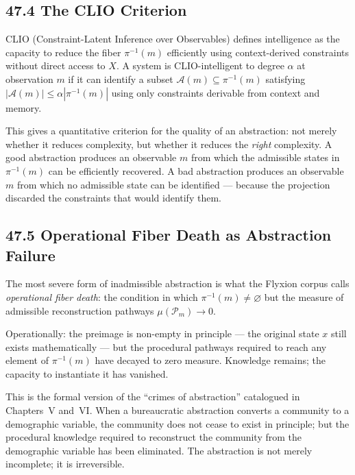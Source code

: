 \documentclass[12pt,letterpaper]{article}
\theoremstyle{remark}
\begin{document}
\subsection{47.4 The CLIO Criterion}

CLIO (Constraint-Latent Inference over Observables) defines
intelligence as the capacity to reduce the fiber $\pi^{-1}(m)$
efficiently using context-derived constraints without direct access
to $X$. A system is CLIO-intelligent to degree $\alpha$ at
observation $m$ if it can identify a subset
$\mathcal{A}(m) \subseteq \pi^{-1}(m)$ satisfying
$|\mathcal{A}(m)| \leq \alpha |\pi^{-1}(m)|$ using only
constraints derivable from context and memory.

This gives a quantitative criterion for the quality of an
abstraction: not merely whether it reduces complexity, but whether
it reduces the \emph{right} complexity. A good abstraction
produces an observable $m$ from which the admissible states in
$\pi^{-1}(m)$ can be efficiently recovered. A bad abstraction
produces an observable $m$ from which no admissible state can
be identified — because the projection discarded the constraints
that would identify them.

\subsection{47.5 Operational Fiber Death as Abstraction Failure}

The most severe form of inadmissible abstraction is what the
Flyxion corpus calls \emph{operational fiber death}: the condition
in which $\pi^{-1}(m) \neq \varnothing$ but the measure of
admissible reconstruction pathways $\mu(\mathcal{P}_m) \to 0$.

Operationally: the preimage is non-empty in principle — the
original state $x$ still exists mathematically — but the procedural
pathways required to reach any element of $\pi^{-1}(m)$ have
decayed to zero measure. Knowledge remains; the capacity to
instantiate it has vanished.

This is the formal version of the ``crimes of abstraction''
catalogued in Chapters~V and~VI. When a bureaucratic abstraction
converts a community to a demographic variable, the community does
not cease to exist in principle; but the procedural knowledge
required to reconstruct the community from the demographic variable
has been eliminated. The abstraction is not merely incomplete; it
is irreversible.
\end{document}
